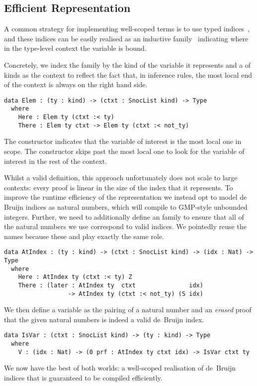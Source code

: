 \subsection{Efficient \DeBruijn{} Representation}
\label{sec:design:deBruijn}

A common strategy for implementing well-scoped terms is to use typed
\emph{\DeBruijn{}} indices~\cite{MANUAL:journals/math/debruijn72}, and these indices can be easily realised as an inductive family~\cite{DBLP:journals/fac/Dybjer94}
indicating where in the type-level context the variable is bound.

Concretely, we index the  family by the kind of the variable it represents and a  of kinds as the context to reflect the fact that,
in inference rules, the most local end of the context is always on the right hand side.

\begin{Verbatim}
data Elem : (ty : kind) -> (ctxt : SnocList kind) -> Type
  where
    Here : Elem ty (ctxt :< ty)
    There : Elem ty ctxt -> Elem ty (ctxt :< not_ty)
\end{Verbatim}

The  constructor indicates that the variable of interest is
the most local one in scope.
%
The  constructor skips past the most local one to look for
the variable of interest in the rest of the context.

Whilst a valid definition, this approach unfortunately does not scale to
large contexts: every  proof is linear in the size of the \DeBruijn{}
index that it represents.
%
To improve the runtime efficiency of the representation we instead opt to
model de Bruijn indices as natural numbers, which \Idris{} will compile to
GMP-style unbounded integers.
%
Further, we need to additionally define an  family to ensure that
all of the natural numbers we use correspond to valid indices.
%
We pointedly reuse the  names because these 
and  play exactly the same role.

\begin{Verbatim}
data AtIndex : (ty : kind) -> (ctxt : SnocList kind) -> (idx : Nat) -> Type
  where
    Here : AtIndex ty (ctxt :< ty) Z
    There : (later : AtIndex ty  ctxt               idx)
                  -> AtIndex ty (ctxt :< not_ty) (S idx)
\end{Verbatim}

\noindent
We then define a variable as the pairing of a natural number and an \emph{erased}
proof that the given natural numbers is indeed a valid de~Bruijn index.

\begin{Verbatim}
data IsVar : (ctxt : SnocList kind) -> (ty : kind) -> Type
  where
    V : (idx : Nat) -> (0 prf : AtIndex ty ctxt idx) -> IsVar ctxt ty
\end{Verbatim}

We now have the best of both worlds: a well-scoped realisation of de~Bruijn indices
that is guaranteed to be compiled efficiently.


